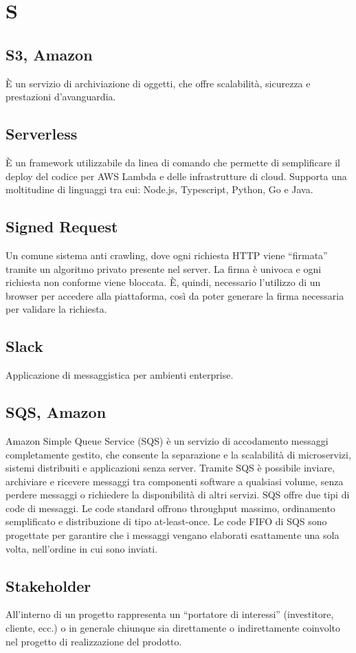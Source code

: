 \section{S}

\subsection{S3, Amazon}
È un servizio di archiviazione di oggetti, che offre scalabilità, sicurezza e prestazioni d'avanguardia. 

\subsection{Serverless}
È un framework utilizzabile da linea di comando che permette di semplificare il deploy del codice per AWS Lambda e delle infrastrutture di cloud. Supporta una moltitudine di linguaggi tra cui: Node.js, Typescript, Python, Go e Java.

\subsection{Signed Request}
Un comune sistema anti crawling, dove ogni richiesta HTTP viene “firmata” tramite un algoritmo privato presente nel server. La firma è univoca e ogni richiesta non conforme viene bloccata. È, quindi, necessario l'utilizzo di un browser per accedere alla piattaforma, così da poter generare la firma necessaria per validare la richiesta.

\subsection{Slack}
Applicazione di messaggistica per ambienti enterprise.

\subsection{SQS, Amazon}
Amazon Simple Queue Service (SQS) è un servizio di accodamento messaggi completamente gestito, che consente la separazione e la scalabilità di microservizi, sistemi distribuiti e applicazioni senza server. Tramite SQS è possibile inviare, archiviare e ricevere messaggi tra componenti software a qualsiasi volume, senza perdere messaggi o richiedere la disponibilità di altri servizi.
SQS offre due tipi di code di messaggi. Le code standard offrono throughput massimo, ordinamento semplificato e distribuzione di tipo at-least-once. Le code FIFO di SQS sono progettate per garantire che i messaggi vengano elaborati esattamente una sola volta, nell'ordine in cui sono inviati.

\subsection{Stakeholder}
All'interno di un progetto rappresenta un “portatore di interessi” (investitore, cliente, ecc.) o in generale chiunque sia direttamente o indirettamente coinvolto nel progetto di realizzazione del prodotto.

\clearpage